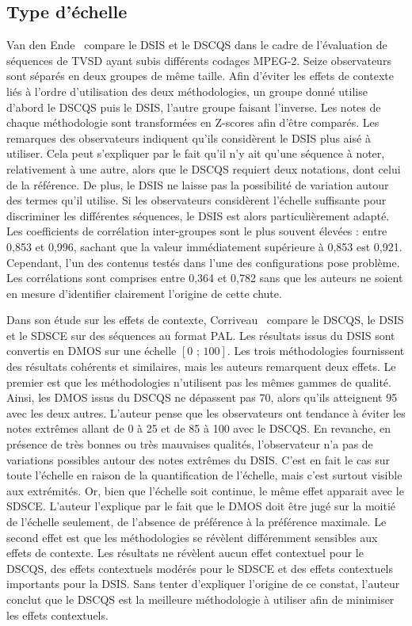\subsection{Type d'échelle}
Van den Ende~\cite{ende-ei2007} compare le DSIS et le DSCQS dans le cadre de l'évaluation de séquences de TVSD ayant subis différents codages MPEG-2. Seize observateurs sont séparés en deux groupes de même taille. Afin d'éviter les effets de contexte liés à l'ordre d'utilisation des deux méthodologies, un groupe donné utilise d'abord le DSCQS puis le DSIS, l'autre groupe faisant l'inverse. Les notes de chaque méthodologie sont transformées en Z-scores afin d'être comparés. Les remarques des observateurs indiquent qu'ils considèrent le DSIS plus aisé à utiliser. Cela peut s'expliquer par le fait qu'il n'y ait qu'une séquence à noter, relativement à une autre, alors que le DSCQS requiert deux notations, dont celui de la référence. De plus, le DSIS ne laisse pas la possibilité de variation autour des termes qu'il utilise. Si les observateurs considèrent l'échelle suffisante pour discriminer les différentes séquences, le DSIS est alors particulièrement adapté. Les coefficients de corrélation inter-groupes sont le plus souvent élevées : entre 0,853 et 0,996, sachant que la valeur immédiatement supérieure à 0,853 est 0,921. Cependant, l'un des contenus testés dans l'une des configurations pose problème. Les corrélations sont comprises entre 0,364 et 0,782 sans que les auteurs ne soient en mesure d'identifier clairement l'origine de cette chute.

Dans son étude sur les effets de contexte, Corriveau~\cite{corriveau-subjScales} compare le DSCQS, le DSIS et le SDSCE sur des séquences au format PAL. Les résultats issus du DSIS sont convertis en DMOS sur une échelle $[\text{0 ; }\text{100}]$. Les trois méthodologies fournissent des résultats cohérents et similaires, mais les auteurs remarquent deux effets. Le premier est que les méthodologies n'utilisent pas les mêmes gammes de qualité. Ainsi, les DMOS issus du DSCQS ne dépassent pas 70, alors qu'ils atteignent 95 avec les deux autres. L'auteur pense que les observateurs ont tendance à éviter les notes extrêmes allant de 0 à 25 et de 85 à 100 avec le DSCQS. En revanche, en présence de très bonnes ou très mauvaises qualités, l'observateur n'a pas de variations possibles autour des notes extrêmes du DSIS. C'est en fait le cas sur toute l'échelle en raison de la quantification de l'échelle, mais c'est surtout visible aux extrémités. Or, bien que l'échelle soit continue, le même effet apparait avec le SDSCE. L'auteur l'explique par le fait que le DMOS doit être jugé sur la moitié de l'échelle seulement, de l'absence de préférence à la préférence maximale. Le second effet est que les méthodologies se révèlent différemment sensibles aux effets de contexte. Les résultats ne révèlent aucun effet contextuel pour le DSCQS, des effets contextuels modérés pour le SDSCE et des effets contextuels importants pour la DSIS. Sans tenter d'expliquer l'origine de ce constat, l'auteur conclut que le DSCQS est la meilleure méthodologie à utiliser afin de minimiser les effets contextuels.

